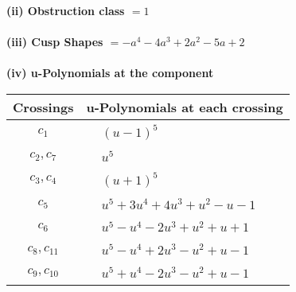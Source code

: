 \documentclass[1p]{elsarticle_modified}
\theoremstyle{definition}
\begin{document}
\flushleft \textbf{(ii) Obstruction class $= 1$}\\~\\
\flushleft \textbf{(iii) Cusp Shapes $= - a^4-4 a^3+2 a^2-5 a+2$}\\~\\
\newpage\renewcommand{\arraystretch}{1}
\flushleft \textbf{(iv) u-Polynomials at the component}\newline \\
\begin{tabular}{m{50pt}|m{274pt}}
Crossings & \hspace{64pt}u-Polynomials at each crossing \\
\hline $$\begin{aligned}c_{1}\end{aligned}$$&$\begin{aligned}
&(u-1)^5
\end{aligned}$\\
\hline $$\begin{aligned}c_{2},c_{7}\end{aligned}$$&$\begin{aligned}
&u^5
\end{aligned}$\\
\hline $$\begin{aligned}c_{3},c_{4}\end{aligned}$$&$\begin{aligned}
&(u+1)^5
\end{aligned}$\\
\hline $$\begin{aligned}c_{5}\end{aligned}$$&$\begin{aligned}
&u^5+3 u^4+4 u^3+u^2- u-1
\end{aligned}$\\
\hline $$\begin{aligned}c_{6}\end{aligned}$$&$\begin{aligned}
&u^5- u^4-2 u^3+u^2+u+1
\end{aligned}$\\
\hline $$\begin{aligned}c_{8},c_{11}\end{aligned}$$&$\begin{aligned}
&u^5- u^4+2 u^3- u^2+u-1
\end{aligned}$\\
\hline $$\begin{aligned}c_{9},c_{10}\end{aligned}$$&$\begin{aligned}
&u^5+u^4-2 u^3- u^2+u-1
\end{aligned}$\\
\hline
\end{tabular}\\~\\
\end{document}
